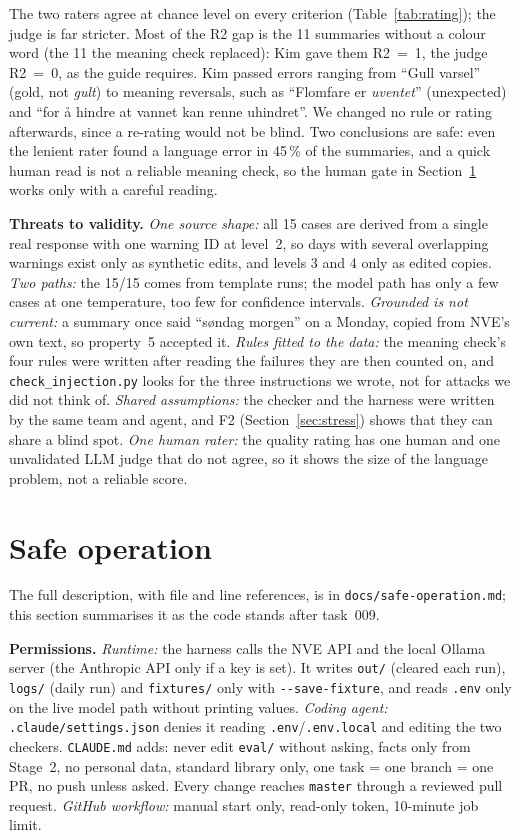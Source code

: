 \documentclass{article}
\newcommand{\code}[1]{\texttt{#1}}
\begin{document}
The two raters agree at chance level on every criterion (Table~\ref{tab:rating}); the judge is far stricter. Most of the R2 gap is the 11 summaries without a colour word (the 11 the meaning check replaced): Kim gave them R2~=~1, the judge R2~=~0, as the guide requires. Kim passed errors ranging from ``Gull varsel'' (gold, not \emph{gult}) to meaning reversals, such as ``Flomfare er \emph{uventet}'' (unexpected) and ``for å hindre at vannet kan renne uhindret''. We changed no rule or rating afterwards, since a re-rating would not be blind. Two conclusions are safe: even the lenient rater found a language error in 45\,\% of the summaries, and a quick human read is not a reliable meaning check, so the human gate in Section~\ref{sec:safe} works only with a careful reading.

\textbf{Threats to validity.} \emph{One source shape:} all 15 cases are derived from a single real response with one warning ID at level~2, so days with several overlapping warnings exist only as synthetic edits, and levels 3 and 4 only as edited copies. \emph{Two paths:} the 15/15 comes from template runs; the model path has only a few cases at one temperature, too few for confidence intervals. \emph{Grounded is not current:} a summary once said ``søndag morgen'' on a Monday, copied from NVE's own text, so property~5 accepted it. \emph{Rules fitted to the data:} the meaning check's four rules were written after reading the failures they are then counted on, and \code{check\_injection.py} looks for the three instructions we wrote, not for attacks we did not think of. \emph{Shared assumptions:} the checker and the harness were written by the same team and agent, and F2 (Section~\ref{sec:stress}) shows that they can share a blind spot. \emph{One human rater:} the quality rating has one human and one unvalidated LLM judge that do not agree, so it shows the size of the language problem, not a reliable score.

\section{Safe operation}
\label{sec:safe}

The full description, with file and line references, is in \code{docs/safe-operation.md}; this section summarises it as the code stands after task~009.

\textbf{Permissions.} \emph{Runtime:} the harness calls the NVE API and the local Ollama server (the Anthropic API only if a key is set). It writes \code{out/} (cleared each run), \code{logs/} (daily run) and \code{fixtures/} only with \code{-{}-save-fixture}, and reads \code{.env} only on the live model path without printing values. \emph{Coding agent:} \code{.claude/settings.json} denies it reading \code{.env}/\code{.env.local} and editing the two checkers. \code{CLAUDE.md} adds: never edit \code{eval/} without asking, facts only from Stage~2, no personal data, standard library only, one task = one branch = one PR, no push unless asked. Every change reaches \code{master} through a reviewed pull request. \emph{GitHub workflow:} manual start only, read-only token, 10-minute job limit.
\end{document}
